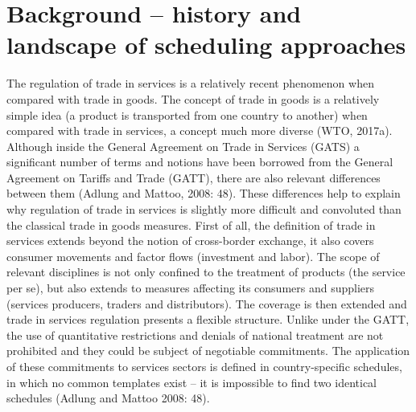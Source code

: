 \documentclass{article}
\begin{document}
\section{Background -- history and landscape of scheduling approaches}

The regulation of trade in services is a relatively recent phenomenon when compared with trade in goods. The concept of trade in goods is a relatively simple idea (a product is transported from one country to another) when compared with trade in services, a concept much more diverse (WTO, 2017a). Although inside the General Agreement on Trade in Services (GATS) a significant number of terms and notions have been borrowed from the General Agreement on Tariffs and Trade (GATT), there are also relevant differences between them (Adlung and Mattoo, 2008: 48). These differences help to explain why regulation of trade in services is slightly more difficult and convoluted than the classical trade in goods measures. First of all, the definition of trade in services extends beyond the notion of cross-border exchange, it also covers consumer movements and factor flows (investment and labor). The scope of relevant disciplines is not only confined to the treatment of products (the service per se), but also extends to measures affecting its consumers and suppliers (services producers, traders and distributors). The coverage is then extended and trade in services regulation presents a flexible structure. Unlike under the GATT, the use of quantitative restrictions and denials of national treatment are not prohibited and they could be subject of negotiable commitments. The application of these commitments to services sectors is defined in country-specific schedules, in which no common templates exist – it is impossible to find two identical schedules (Adlung and Mattoo 2008: 48).

\smallskip
\end{document}
